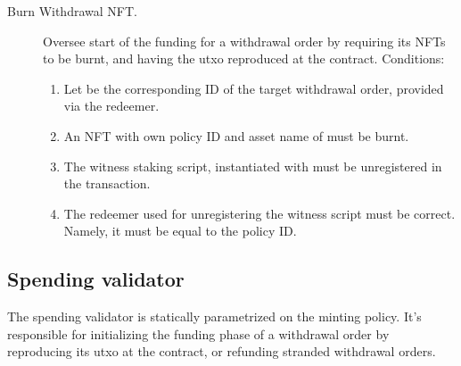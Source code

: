 \documentclass[../midgard.tex]{subfiles}
\begin{document}
\begin{description}
    \item[Burn Withdrawal NFT.] Oversee start of the funding for a withdrawal order by requiring its NFTs to be burnt, and having the utxo reproduced at the  contract.
    Conditions:
      \begin{enumerate}
        \item Let  be the corresponding ID of the target withdrawal order, provided via the redeemer.
        \item An NFT with own policy ID and asset name of  must be burnt.
        \item The witness staking script, instantiated with  must be unregistered in the transaction.
        \item The redeemer used for unregistering the witness script must be correct. Namely, it must be equal to the  policy ID.
      \end{enumerate}
\end{description}

\subsection{Spending validator}
\label{h:withdrawal-order-spending-validator}

The  spending validator is statically parametrized on the  minting policy.
It's responsible for initializing the funding phase of a withdrawal order by reproducing its utxo at the  contract, or refunding stranded withdrawal orders.
\end{document}
